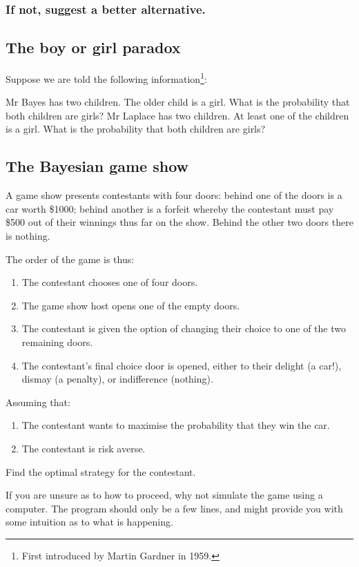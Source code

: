 \documentclass[11pt,fullpage]{book}
\begin{document}
\subsubsection{If not, suggest a better alternative.}

\subsection{The boy or girl paradox}
Suppose we are told the following information\footnote{First introduced by Martin Gardner in 1959.}:

Mr Bayes has two children. The older child is a girl. What is the probability that both children are girls?
Mr Laplace has two children. At least one of the children is a girl. What is the probability that both children are girls?

\subsection{The Bayesian game show}
A game show presents contestants with four doors: behind one of the doors is a car worth \$1000; behind another is a forfeit whereby the contestant must pay \$500 out of their winnings thus far on the show. Behind the other two doors there is nothing.

The order of the game is thus:
\begin{enumerate}
\item The contestant chooses one of four doors.
\item The game show host opens one of the empty doors.
\item The contestant is given the option of changing their choice to one of the two remaining doors.
\item The contestant's final choice door is opened, either to their delight (a car!), dismay (a penalty), or indifference (nothing).
\end{enumerate}

Assuming that:

\begin{enumerate}
\item The contestant wants to maximise the probability that they win the car.
\item The contestant is risk averse.
\end{enumerate}

Find the optimal strategy for the contestant.

If you are unsure as to how to proceed, why not simulate the game using a computer. The program should only be a few lines, and might provide you with some intuition as to what is happening.
\end{document}

